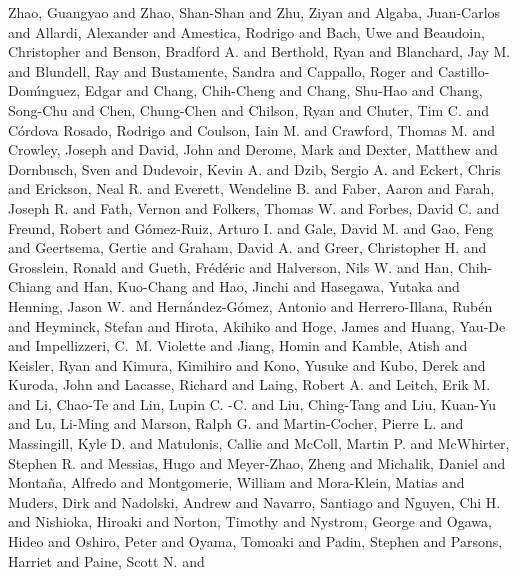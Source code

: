 {{{         {Zhao}, Guangyao and {Zhao}, Shan-Shan and {Zhu}, Ziyan and
         {Algaba}, Juan-Carlos and {Allardi}, Alexander and {Amestica}, Rodrigo and
         {Bach}, Uwe and {Beaudoin}, Christopher and {Benson}, Bradford A. and
         {Berthold}, Ryan and {Blanchard}, Jay M. and {Blundell}, Ray and
         {Bustamente}, Sandra and {Cappallo}, Roger and
         {Castillo-Dom{\'\i}nguez}, Edgar and {Chang}, Chih-Cheng and
         {Chang}, Shu-Hao and {Chang}, Song-Chu and {Chen}, Chung-Chen and
         {Chilson}, Ryan and {Chuter}, Tim C. and {C{\'o}rdova Rosado}, Rodrigo and
         {Coulson}, Iain M. and {Crawford}, Thomas M. and {Crowley}, Joseph and
         {David}, John and {Derome}, Mark and {Dexter}, Matthew and
         {Dornbusch}, Sven and {Dudevoir}, Kevin A. and {Dzib}, Sergio A. and
         {Eckert}, Chris and {Erickson}, Neal R. and {Everett}, Wendeline B. and
         {Faber}, Aaron and {Farah}, Joseph R. and {Fath}, Vernon and
         {Folkers}, Thomas W. and {Forbes}, David C. and {Freund}, Robert and
         {G{\'o}mez-Ruiz}, Arturo I. and {Gale}, David M. and {Gao}, Feng and
         {Geertsema}, Gertie and {Graham}, David A. and {Greer}, Christopher H. and
         {Grosslein}, Ronald and {Gueth}, Fr{\'e}d{\'e}ric and
         {Halverson}, Nils W. and {Han}, Chih-Chiang and {Han}, Kuo-Chang and
         {Hao}, Jinchi and {Hasegawa}, Yutaka and {Henning}, Jason W. and
         {Hern{\'a}ndez-G{\'o}mez}, Antonio and {Herrero-Illana}, Rub{\'e}n and
         {Heyminck}, Stefan and {Hirota}, Akihiko and {Hoge}, James and
         {Huang}, Yau-De and {Impellizzeri}, C.~M. Violette and {Jiang}, Homin and
         {Kamble}, Atish and {Keisler}, Ryan and {Kimura}, Kimihiro and
         {Kono}, Yusuke and {Kubo}, Derek and {Kuroda}, John and
         {Lacasse}, Richard and {Laing}, Robert A. and {Leitch}, Erik M. and
         {Li}, Chao-Te and {Lin}, Lupin C. -C. and {Liu}, Ching-Tang and
         {Liu}, Kuan-Yu and {Lu}, Li-Ming and {Marson}, Ralph G. and
         {Martin-Cocher}, Pierre L. and {Massingill}, Kyle D. and
         {Matulonis}, Callie and {McColl}, Martin P. and
         {McWhirter}, Stephen R. and {Messias}, Hugo and {Meyer-Zhao}, Zheng and
         {Michalik}, Daniel and {Monta{\~n}a}, Alfredo and
         {Montgomerie}, William and {Mora-Klein}, Matias and {Muders}, Dirk and
         {Nadolski}, Andrew and {Navarro}, Santiago and {Nguyen}, Chi H. and
         {Nishioka}, Hiroaki and {Norton}, Timothy and {Nystrom}, George and
         {Ogawa}, Hideo and {Oshiro}, Peter and {Oyama}, Tomoaki and
         {Padin}, Stephen and {Parsons}, Harriet and {Paine}, Scott N. and
}}}
